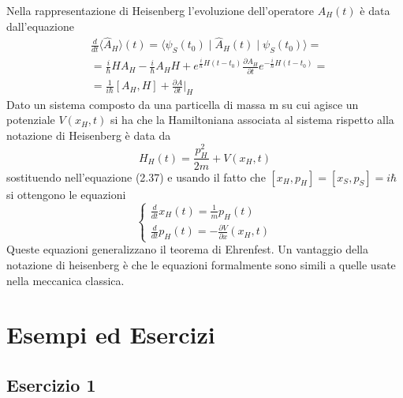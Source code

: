 \noindent Nella rappresentazione di Heisenberg l'evoluzione  dell'operatore $A_H(t)$ \`e data dall'equazione 
\begin{equation}
\begin{aligned}
	& \frac{d}{dt} \langle \hat{A}_{H}\rangle (t) = \langle \psi_S(t_0) \mid \hat{A}_{H}(t) \mid \psi_S(t_0) \rangle =   
	\\[0.5cm] &    = \frac{i}{\hbar} HA_{H}-\frac{i}{\hbar}A_{H}H + e^{\frac{i}{\hbar}H(t-t_0)}\frac{\partial A_{H}}{\partial t}e^{-\frac{i}{\hbar}H(t-t_0)}= \\[0.5cm] & = \frac{1}{i\hbar} \left [A_{H},H \right ] + \frac{\partial A}{\partial t} \Big \vert_{H}  
\end{aligned} 
\end{equation}
Dato un sistema composto da una particella di massa m su cui agisce un potenziale $V(x_H,t)$ si ha che la Hamiltoniana associata al sistema rispetto alla notazione di Heisenberg \`e data da 
\begin{equation*}
	H_H(t) = \frac{p_{H}^2}{2m} + V(x_H,t)
\end{equation*}
sostituendo nell'equazione (2.37) e usando il fatto che $[x_H,p_H] = [x_S,p_S] = i \hbar $ si ottengono le equazioni 
\begin{equation}
	\left \{\begin{array}{l}
		\frac{d}{dt}x_{H}(t) = \frac{1}{m}p_{H}(t) \\[0.2cm]
		\frac{d}{dt}p_{H}(t) = - \frac{\partial V}{\partial x}(x_H,t)
	\end{array}\right.
\end{equation}
Queste equazioni generalizzano il teorema di Ehrenfest. Un vantaggio della notazione di heisenberg \`e che le equazioni formalmente sono simili a quelle usate nella meccanica classica.

\section{Esempi ed Esercizi}

\subsection{Esercizio 1}

